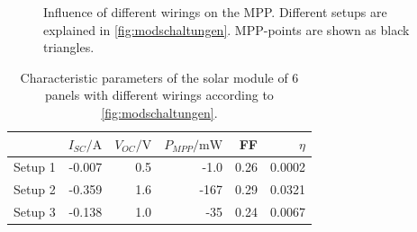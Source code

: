 \documentclass[english,  %
parskip=full,  %
headsepline]{scrartcl}
\begin{document}
\begin{figure}
    \centering
    
    \caption{Influence of different wirings on the MPP. Different setups are explained in \cref{fig:modschaltungen}. MPP-points are shown as black triangles.}
    \label{fig:C2}
\end{figure}
\begin{table}[H]
\centering
    \caption{Characteristic parameters of the solar module of 6 panels with different wirings according to \cref{fig:modschaltungen}.}
    \label{tab:C2}
\begin{tabular}{lrrrrr}
\toprule
&$I_{SC} / \si{\ampere}$&$V_{OC} / \si{\volt}$&$P_{MPP}/ \si{\milli\watt}$&FF&$\eta$\\
\midrule
Setup 1 &  -0.007&0.5&-1.0&0.26&0.0002\\
Setup 2 &  -0.359&1.6&-167&0.29&0.0321\\
Setup 3 &  -0.138&1.0&-35&0.24&0.0067\\
\bottomrule
\end{tabular}
\end{table}
\end{document}
